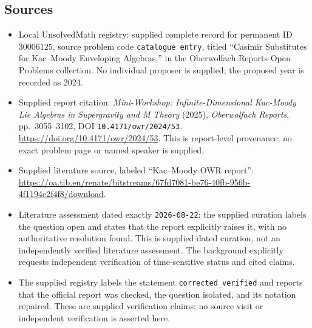 \documentclass[11pt]{article}
\begin{document}
\subsection{Sources}
\begin{itemize}
\item Local UnsolvedMath registry: supplied complete record for permanent ID \(30006125\), source problem code \texttt{catalogue entry}, titled ``Casimir Substitutes for Kac--Moody Enveloping Algebras,'' in the Oberwolfach Reports Open Problems collection. No individual proposer is supplied; the proposed year is recorded as 2024.
\item Supplied report citation: \emph{Mini-Workshop: Infinite-Dimensional Kac-Moody Lie Algebras in Supergravity and M Theory} (2025), \emph{Oberwolfach Reports}, pp.\ 3055--3102, DOI \texttt{10.4171/owr/2024/53}. \url{https://doi.org/10.4171/owr/2024/53}. This is report-level provenance; no exact problem page or named speaker is supplied.
\item Supplied literature source, labeled ``Kac--Moody OWR report'': \url{https://oa.tib.eu/renate/bitstreams/67fd7081-be76-40fb-956b-4f1194e2f4f8/download}.
\item Literature assessment dated exactly \texttt{2026-08-22}: the supplied curation labels the question open and states that the report explicitly raises it, with no authoritative resolution found. This is supplied dated curation, not an independently verified literature assessment. The background explicitly requests independent verification of time-sensitive status and cited claims.
\item The supplied registry labels the statement \texttt{corrected\_verified} and reports that the official report was checked, the question isolated, and its notation repaired. These are supplied verification claims; no source visit or independent verification is asserted here.
\end{itemize}
\end{document}
